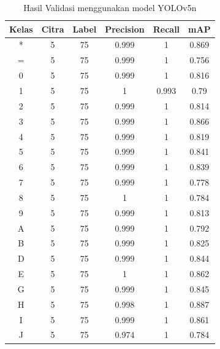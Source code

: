\begin{center}
  \begin{longtable}[c]{|c|c|c|c|c|c|}
    \caption{Hasil Validasi menggunakan model YOLOv5n}
    \label{tb:valresultyolov5n}\\
    \hline
    \textbf{Kelas} & \textbf{Citra} & \textbf{Label} & \textbf{Precision} & \textbf{Recall} & \textbf{mAP} \\ \hline
    \endhead
    *      & 5      & 75     & 0.999      & 1      & 0.869    \\ \hline
    =      & 5      & 75     & 0.999      & 1      & 0.756    \\ \hline
    0      & 5      & 75     & 0.999      & 1      & 0.816    \\ \hline
    1      & 5      & 75     & 1          & 0.993  & 0.79     \\ \hline
    2      & 5      & 75     & 0.999      & 1      & 0.814    \\ \hline
    3      & 5      & 75     & 0.999      & 1      & 0.866    \\ \hline
    4      & 5      & 75     & 0.999      & 1      & 0.819    \\ \hline
    5      & 5      & 75     & 0.999      & 1      & 0.841    \\ \hline
    6      & 5      & 75     & 0.999      & 1      & 0.839    \\ \hline
    7      & 5      & 75     & 0.999      & 1      & 0.778    \\ \hline
    8      & 5      & 75     & 1          & 1      & 0.784    \\ \hline
    9      & 5      & 75     & 0.999      & 1      & 0.813    \\ \hline
    A      & 5      & 75     & 0.999      & 1      & 0.792    \\ \hline
    B      & 5      & 75     & 0.999      & 1      & 0.825    \\ \hline
    D      & 5      & 75     & 0.999      & 1      & 0.844    \\ \hline
    E      & 5      & 75     & 1          & 1      & 0.862    \\ \hline
    G      & 5      & 75     & 0.999      & 1      & 0.845    \\ \hline
    H      & 5      & 75     & 0.998      & 1      & 0.887    \\ \hline
    I      & 5      & 75     & 0.999      & 1      & 0.861    \\ \hline
    J      & 5      & 75     & 0.974      & 1      & 0.784    \\ \hline

\end{longtable}
\end{center}
